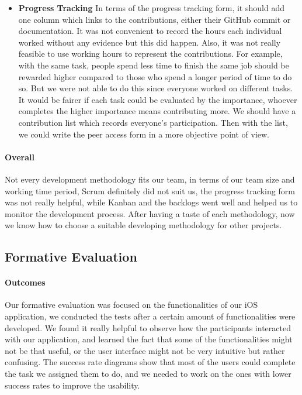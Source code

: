 \documentclass[12pt,a4paper]{article}
\begin{document}
\begin{itemize}
          \item {\bf Progress Tracking} In terms of the progress tracking form, it should add one column which links to the contributions, either their GitHub commit or documentation. It was not convenient to record the hours each individual worked without any evidence but this did happen. Also, it was not really feasible to use working hours to represent the contributions. For example, with the same task, people spend less time to finish the same job should be rewarded higher compared to those who spend a longer period of time to do so. But we were not able to do this since everyone worked on different tasks. It would be fairer if each task could be evaluated by the importance, whoever completes the higher importance means contributing more. We should have a contribution list which records everyone's participation. Then with the list, we could write the peer access form in a more objective point of view.
        \end{itemize}

        \paragraph{Overall} Not every development methodology fits our team, in terms of our team size and working time period, Scrum definitely did not suit us, the progress tracking form was not really helpful, while Kanban and the backlogs went well and helped us to monitor the development process. After having a taste of each methodology, now we know how to choose a suitable developing methodology for other projects.

      \subsection{Formative Evaluation}
        \paragraph{Outcomes} Our formative evaluation was focused on the functionalities of our iOS application, we conducted the tests after a certain amount of functionalities were developed. We found it really helpful to observe how the participants interacted with our application, and learned the fact that some of the functionalities might not be that useful, or the user interface might not be very intuitive but rather confusing. The success rate diagrams show that most of the users could complete the task we assigned them to do, and we needed to work on the ones with lower success rates to improve the usability. 
\end{document}
